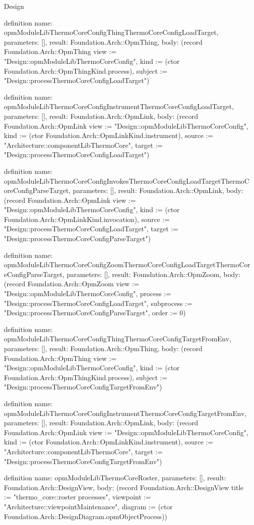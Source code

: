 \begin{lexlean}{Design}
\begin{semanticmodule}
definition{
  name: opmModuleLibThermoCoreConfigThingThermoCoreConfigLoadTarget,
  parameters: [],
  result: Foundation.Arch::OpmThing,
  body: (record Foundation.Arch::OpmThing {view := "Design::opmModuleLibThermoCoreConfig", kind := (ctor Foundation.Arch::OpmThingKind.process), subject := "Design::processThermoCoreConfigLoadTarget"})
}

definition{
  name: opmModuleLibThermoCoreConfigInstrumentThermoCoreConfigLoadTarget,
  parameters: [],
  result: Foundation.Arch::OpmLink,
  body: (record Foundation.Arch::OpmLink {view := "Design::opmModuleLibThermoCoreConfig", kind := (ctor Foundation.Arch::OpmLinkKind.instrument), source := "Architecture::componentLibThermoCore", target := "Design::processThermoCoreConfigLoadTarget"})
}

definition{
  name: opmModuleLibThermoCoreConfigInvokesThermoCoreConfigLoadTargetThermoCoreConfigParseTarget,
  parameters: [],
  result: Foundation.Arch::OpmLink,
  body: (record Foundation.Arch::OpmLink {view := "Design::opmModuleLibThermoCoreConfig", kind := (ctor Foundation.Arch::OpmLinkKind.invocation), source := "Design::processThermoCoreConfigLoadTarget", target := "Design::processThermoCoreConfigParseTarget"})
}

definition{
  name: opmModuleLibThermoCoreConfigZoomThermoCoreConfigLoadTargetThermoCoreConfigParseTarget,
  parameters: [],
  result: Foundation.Arch::OpmZoom,
  body: (record Foundation.Arch::OpmZoom {view := "Design::opmModuleLibThermoCoreConfig", process := "Design::processThermoCoreConfigLoadTarget", subprocess := "Design::processThermoCoreConfigParseTarget", order := 0})
}

definition{
  name: opmModuleLibThermoCoreConfigThingThermoCoreConfigTargetFromEnv,
  parameters: [],
  result: Foundation.Arch::OpmThing,
  body: (record Foundation.Arch::OpmThing {view := "Design::opmModuleLibThermoCoreConfig", kind := (ctor Foundation.Arch::OpmThingKind.process), subject := "Design::processThermoCoreConfigTargetFromEnv"})
}

definition{
  name: opmModuleLibThermoCoreConfigInstrumentThermoCoreConfigTargetFromEnv,
  parameters: [],
  result: Foundation.Arch::OpmLink,
  body: (record Foundation.Arch::OpmLink {view := "Design::opmModuleLibThermoCoreConfig", kind := (ctor Foundation.Arch::OpmLinkKind.instrument), source := "Architecture::componentLibThermoCore", target := "Design::processThermoCoreConfigTargetFromEnv"})
}

definition{
  name: opmModuleLibThermoCoreRoster,
  parameters: [],
  result: Foundation.Arch::DesignView,
  body: (record Foundation.Arch::DesignView {title := "thermo_core::roster processes", viewpoint := "Architecture::viewpointMaintenance", diagram := (ctor Foundation.Arch::DesignDiagram.opmObjectProcess)})
}


\end{semanticmodule}
\end{lexlean}
